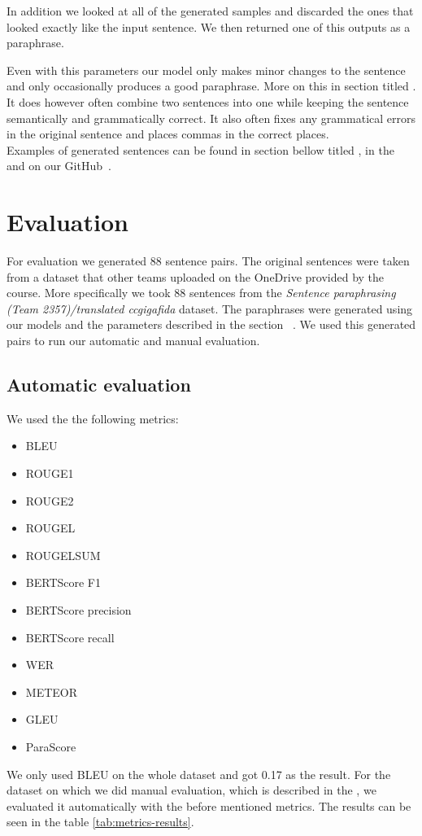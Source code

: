 \documentclass[fleqn,moreauthors,10pt]{ds_report}
\begin{document}
In addition we looked at all of the generated samples and discarded the ones that looked exactly like the input sentence. We then returned one of this outputs as a paraphrase.

Even with this parameters our model only makes minor changes to the sentence and only occasionally produces a good paraphrase. More on this in section titled . It does however often combine two sentences into one while keeping the sentence semantically and grammatically correct. It also often fixes any grammatical errors in the original sentence and places commas in the correct places.\\

Examples of generated sentences can be found in section bellow titled , in the  and on our GitHub~\cite{GitHub}.

\section{Evaluation}
\label{sec:eval}

For evaluation we generated 88 sentence pairs. The original sentences were taken from a dataset that other teams uploaded on the OneDrive provided by the course. More specifically we took 88 sentences from the \textit{Sentence paraphrasing (Team 2357)/translated ccgigafida} dataset. The paraphrases were generated using our models and the parameters described in the section ~. We used this generated pairs to run our automatic and manual evaluation. 

\subsection{Automatic evaluation}
We used the the following metrics:
\begin{itemize}[itemsep=2pt,parsep=2pt,topsep=2pt]
    \item BLEU\cite{HuggingFaceMetrics}
    \item ROUGE1\cite{HuggingFaceMetrics}
    \item ROUGE2\cite{HuggingFaceMetrics}
    \item ROUGEL\cite{HuggingFaceMetrics}
    \item ROUGELSUM\cite{HuggingFaceMetrics}
    \item BERTScore F1\cite{HuggingFaceMetrics}
    \item BERTScore precision\cite{HuggingFaceMetrics}
    \item BERTScore recall\cite{HuggingFaceMetrics}
    \item WER\cite{HuggingFaceMetrics}
    \item METEOR\cite{HuggingFaceMetrics}
    \item GLEU\cite{HuggingFaceMetrics}
    \item ParaScore\cite{GitHubParaScore}
\end{itemize}
We only used BLEU on the whole dataset and got 0.17 as the result. For the dataset on which we did manual evaluation, which is described in the , we evaluated it automatically with the before mentioned metrics. The results can be seen in the table \ref{tab:metrics-results}.
\end{document}
